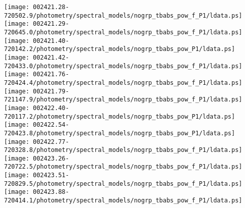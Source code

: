\documentclass{aastex}
\begin{document}
\begin{figure*}[!ht]
\centering
\texttt{[image: 002421.28-720502.9/photometry/spectral\_models/nogrp\_tbabs\_pow\_f\_P1/ldata.ps]} \hfill 
\texttt{[image: 002421.29-720645.0/photometry/spectral\_models/nogrp\_tbabs\_pow\_f\_P1/ldata.ps]} \hfill 
\texttt{[image: 002421.40-720142.2/photometry/spectral\_models/nogrp\_tbabs\_pow\_P1/ldata.ps]} \\ 
\vspace*{0.5in}
\texttt{[image: 002421.42-720433.0/photometry/spectral\_models/nogrp\_tbabs\_pow\_f\_P1/ldata.ps]} \hfill 
\texttt{[image: 002421.76-720424.4/photometry/spectral\_models/nogrp\_tbabs\_pow\_f\_P1/ldata.ps]} \hfill 
\texttt{[image: 002421.79-721147.9/photometry/spectral\_models/nogrp\_tbabs\_pow\_f\_P1/ldata.ps]} \\ 
\vspace*{0.5in}
\texttt{[image: 002422.40-720117.2/photometry/spectral\_models/nogrp\_tbabs\_pow\_P1/ldata.ps]} \hfill 
\texttt{[image: 002422.54-720423.8/photometry/spectral\_models/nogrp\_tbabs\_pow\_P1/ldata.ps]} \hfill 
\texttt{[image: 002422.77-720328.8/photometry/spectral\_models/nogrp\_tbabs\_pow\_f\_P1/ldata.ps]} \\ 
\vspace*{0.5in}
\texttt{[image: 002423.26-720722.5/photometry/spectral\_models/nogrp\_tbabs\_pow\_f\_P1/ldata.ps]} \hfill 
\texttt{[image: 002423.51-720829.5/photometry/spectral\_models/nogrp\_tbabs\_pow\_f\_P1/ldata.ps]} \hfill 
\texttt{[image: 002423.88-720414.1/photometry/spectral\_models/nogrp\_tbabs\_pow\_f\_P1/ldata.ps]} \\ 
\vspace*{0.5in}
\end{figure*}
\clearpage
\end{document}
